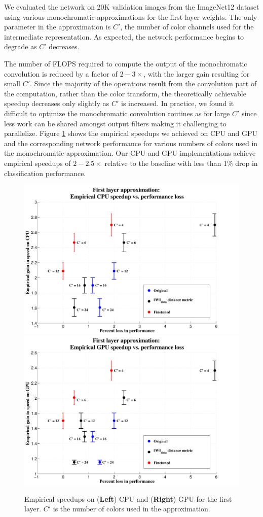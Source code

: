 We evaluated the network on 20K validation images from the ImageNet12 dataset using various monochromatic approximations for the first layer weights. 
The only parameter in the approximation is $C'$, the number of color channels used for the intermediate representation. As expected, the network performance begins to degrade as $C'$ decreases. 

The number of FLOPS required to compute the output of the monochromatic convolution is reduced by a factor of $2-3\times$, with the larger gain resulting for small $C'$. 
Since the majority of the operations result from the convolution part of the computation, rather than the color transform,
the theoretically achievable speedup decreases only slightly as $C'$ is increased.
In practice, we found it difficult to optimize the monochromatic convolution routines as for large $C'$ since less work can be shared amongst output filters making it challenging to parallelize.
Figure \ref{fig:mono_speedups} shows the empirical speedups we achieved on CPU and GPU and the corresponding network performance for various numbers of colors used in the monochromatic approximation.   
Our CPU and GPU implementations achieve empirical speedups of $2-2.5\times$ relative to the baseline with less than 1\% drop in classification performance. 

\begin{figure}[t]
\centering
\begin{minipage}{0.9\textwidth}
      \includegraphics[width=0.5\linewidth]{img/layer1_CPUspeedup_vs_performance_loss_finetune_and_orig.pdf}
	\quad\quad
      \includegraphics[width=0.5\linewidth]{img/layer1_GPUspeedup_vs_performance_loss_finetune_and_orig.pdf}
\end{minipage}
\caption{Empirical speedups on ({\bf Left}) CPU and ({\bf Right}) GPU for the first layer. $C'$ is the number of colors used in the approximation.}
\label{fig:mono_speedups}
\end{figure}

